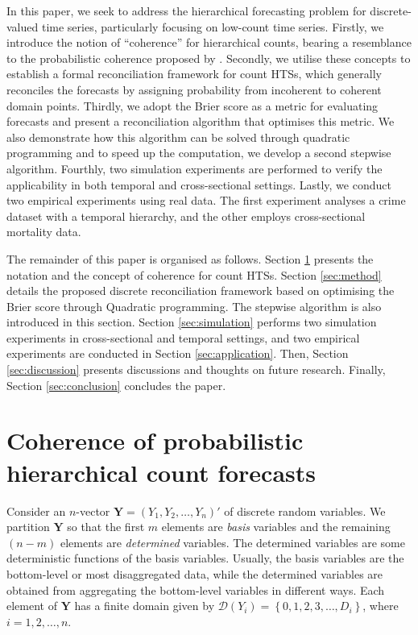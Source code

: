 \documentclass[a4paper,review,12pt,authoryear]{elsarticle}
\newcommand{\bY}{\mathbf{Y}}
\theoremstyle{definition}
\begin{document}
In this paper, we seek to address the hierarchical forecasting problem for discrete-valued time series, particularly focusing on low-count time series.
Firstly, we introduce the notion of ``coherence'' for hierarchical counts,
bearing a resemblance to the probabilistic coherence proposed by \cite{panagiotelisProbabilisticForecastReconciliation2022}.
Secondly, we utilise these concepts to establish a formal reconciliation framework for count HTSs, which generally reconciles the forecasts by assigning probability from incoherent to coherent domain points.
Thirdly, we adopt the Brier score as a metric for evaluating forecasts and present a reconciliation algorithm that optimises this metric.
We also demonstrate how this algorithm can be solved through quadratic programming and to speed up the computation, we develop a second stepwise algorithm.
Fourthly, two simulation experiments are performed to verify the applicability in both temporal and cross-sectional settings.
Lastly, we conduct two empirical experiments using real data. The first experiment analyses a crime dataset with a temporal hierarchy, and the other employs cross-sectional mortality data.

The remainder of this paper is organised as follows.
Section \ref{sec:coherence} presents the notation and the concept of coherence for count HTSs.
Section \ref{sec:method} details the proposed discrete reconciliation framework based on optimising the Brier score through Quadratic programming. The stepwise algorithm is also introduced in this section.
Section \ref{sec:simulation} performs two simulation experiments in cross-sectional and temporal settings, and two empirical experiments are conducted in Section \ref{sec:application}.
Then, Section \ref{sec:discussion} presents discussions and thoughts on future research. 
Finally, Section \ref{sec:conclusion} concludes the paper.



\section{Coherence of probabilistic hierarchical count forecasts}

\label{sec:coherence}


Consider an $n$-vector $\bY=\left(Y_1,Y_2,\ldots,Y_n\right)'$ of discrete random variables.
We partition $\bY$ so that the first $m$ elements are \textit{basis} variables and the remaining $(n-m)$ elements are \textit{determined} variables.
The determined variables are some deterministic functions of the basis variables. Usually, the basis variables are the bottom-level or most disaggregated data, while the determined variables are obtained from aggregating the bottom-level variables in different ways.
Each element of $\bY$ has a finite domain given by $\mathcal{D}(Y_i)=\left\{0, 1,2,3,\dots,D_i\right\}$, where $i = 1, 2, \dots, n$.
\end{document}
